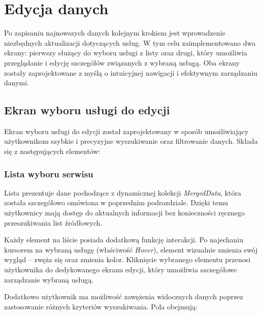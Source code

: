 \section{Edycja danych}

Po zapisaniu najnowszych danych kolejnym krokiem jest wprowadzenie niezbędnych aktualizacji dotyczących usług. W tym celu zaimplementowano dwa ekrany: pierwszy służący do wyboru usługi z listy oraz drugi, który umożliwia przeglądanie i edycję szczegółów związanych z wybraną usługą. Oba ekrany zostały zaprojektowane z myślą o intuicyjnej nawigacji i efektywnym zarządzaniu danymi.

\subsection{Ekran wyboru usługi do edycji}


Ekran wyboru usługi do edycji został zaprojektowany w sposób umożliwiający użytkownikom szybkie i precyzyjne wyszukiwanie oraz filtrowanie danych. Składa się z następujących elementów:

\subsubsection*{Lista wyboru serwisu}

Lista prezentuje dane pochodzące z dynamicznej kolekcji \emph{MergedData}, która została szczegółowo omówiona w poprzednim podrozdziale. Dzięki temu użytkownicy mają dostęp do aktualnych informacji bez konieczności ręcznego przeszukiwania list źródłowych.

Każdy element na liście posiada dodatkową funkcję interakcji. Po najechaniu kursorem na wybraną usługę (właściwość \emph{Hover}), element wizualnie zmienia swój wygląd -- zwęża się oraz zmienia kolor. Kliknięcie wybranego elementu przenosi użytkownika do dedykowanego ekranu edycji, który umożliwia szczegółowe zarządzanie wybraną usługą.

Dodatkowo użytkownik ma możliwość zawężenia widocznych danych poprzez zastosowanie różnych kryteriów wyszukiwania. Pola obejmują:

